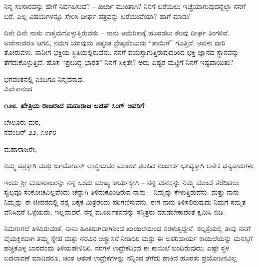 ನಿನ್ನ ಸಂಸಾರವನ್ನು ಹೇಗೆ ನಿರ್ವಹಿಸುವೆ? – ಖರ್ಚು ಮುಂತಾಗಿ? ನಿನಗೆ ಬರೆಯಲು ಇಚ್ಛೆಯಾಗುವುದನ್ನೆಲ್ಲಾ ನನಗೆ ಬರೆ. ಎಲ್ಲ ವಿಷಯಗಳನ್ನೂ ಸೇರಿಸಿ ದೀರ್ಘ ಪತ್ರವನ್ನು ಬರೆಯುವೆಯಾ? ಹಾಗೆ ಮಾಡು!

ದಿನೇ ದಿನೇ ನಾನು ಉತ್ತಮಗೊಳ್ಳುತ್ತಿರುವೆನು – ನಾನು ಅಮೆರಿಕಾಕ್ಕೆ ಹೊರಡಲು ಕೆಲವು ದೀರ್ಘ ತಿಂಗಳಿವೆ. ಅದೇನಾದರೂ ಆಗಲಿ, ನಮಗೆ ಯಾವುದು ಅತ್ಯಂತ ಶ್ರೇಷ್ಠವೆಂಬುದು “ತಾಯಿಗೆ” ಗೊತ್ತಿದೆ. ಅವಳು ದಾರಿ ತೋರುವಳು. ನಾನೀಗ ಭಕ್ತಿಯ ಸ್ಥಿತಿಯಲ್ಲಿರುವೆನು. ನನಗೆ ವಯಸ್ಸಾಗುತ್ತಿರುವುದರಿಂದ ಭಕ್ತಿ ಜ್ಞಾನದ ಸ್ಥಾನವನ್ನು ತೆಗೆದುಕೊಳ್ಳುತ್ತಿದೆ. ಹೊಸ “ಪ್ರಬುದ್ಧ ಭಾರತ” ನಿನಗೆ ಸಿಕ್ಕಿತೇ? ಅದು ಎಷ್ಟರ ಮಟ್ಟಿಗೆ ನಿನಗೆ ಇಷ್ಟವಾಯಿತು?

\begin{flushright}
ಭಗವಂತನಲ್ಲಿ ಎಂದಿಗೂ ನಿನ್ನವನಾದ,\\ವಿವೇಕಾನಂದ
\end{flushright}

\begin{center}
\textbf{೧೨೮. ಖೇತ್ರಿಯ ರಾಜರಾದ ಮಹಾರಾಜ ಅಜಿತ್ ಸಿಂಗ್ ಅವರಿಗೆ}
\end{center}

\begin{flushright}
ಬೇಲೂರು ಮಠ,\\ನವಂಬರ್ ೨೨, ೧೮೯೮
\end{flushright}

ಮಹಾರಾಜರೇ,

ನಿಮ್ಮ ಪತ್ರಕ್ಕಾಗಿ ಮತ್ತು ಜಗಮೋಹನ್ ಲಾಲ್ಜಿಯವರ ಮೂಲಕ ತಲಪಿದ ನಿಂಬಾರ್ಕ ಭಾಷ್ಯಕ್ಕಾಗಿ ಅನೇಕ ಧನ್ಯವಾದಗಳು.

ಇಂದು ಶ‍್ರೀ ಮಹಾರಾಜರನ್ನು ನನ್ನ ಒಂದು ಮುಖ್ಯ ಕಾರ್ಯಕ್ಕಾಗಿ – ನನ್ನ ಮನಸ್ಸನ್ನು ನಿಮ್ಮ ಮುಂದೆ ತೆರೆದಿಡಲು ಸ್ವಲ್ಪವೂ ಸಂಕೋಚವಿಲ್ಲವೆಂದು ಚೆನ್ನಾಗಿ ತಿಳಿದುಕೊಂಡಿರುವ ನಾನು – ನಿಮ್ಮನ್ನು ಕೇಳುತ್ತಿರುವೆನು. ಮತ್ತು ನಾನು ನಿಮ್ಮನ್ನು ಈ ಜೀವನದಲ್ಲಿ ನನ್ನ ಏಕೈಕ ಮಿತ್ರರೆಂದು ಪರಿಗಣಿಸುವೆನು. ಈಗ ನಾನು ತಿಳಿಸಲಿರುವುದು ನಿಮಗೆ ಸಮ್ಮತ ವೆನಿಸಿದರೆ ಒಳ್ಳೆಯದು; ಇಲ್ಲವಾದರೆ, ನನ್ನ ಮೂರ್ಖತನವನ್ನು ಸನ್ಮಿತ್ರರು ಮಾಡಬೇಕಾದಂತೆ ಕ್ಷಮಿಸಿ ಬಿಡಿ.

ನಿಮಗಾಗಲೆ ತಿಳಿದಿರುವಂತೆ, ನಾನು ಹಿಂತಿರುಗಿದಾಗಿನಿಂದ ಖಾಯಿಲೆಯಿಂದ ನರಳುತ್ತಿದ್ದೇನೆ. ಕಲ್ಕತ್ತೆಯಲ್ಲಿ ತಾವು ನನಗೆ ವೈಯಕ್ತಿಕವಾಗಿ ತಮ್ಮ ಸ್ನೇಹ ಮತ್ತು ನೆರವಿನ ಆಶ್ವಾಸನೆ ನೀಡಿದಿರಿ ಮತ್ತು ಈ ಅಪರಿಹಾರ್ಯ ಕಾಯಿಲೆಯನ್ನು ಮನಸ್ಸಿಗೆ ಹಚ್ಚಿಕೊಳ್ಳ ಬಾರದೆಂದು ತಿಳಿಯಹೇಳಿದಿರಿ. ನರಗಳ ಉದ್ರೇಕದಿಂದ ಈ ಕಾಯಿಲೆ ಬಂದಿರುವುದು; ಎಷ್ಟೇ ಸ್ಥಳ ಬದಲಾವಣೆ ಮಾಡಿದರೂ, ಚಿಂತೆ ಆತಂಕ ಉದ್ರೇಕಗಳನ್ನು ನನ್ನಿಂದ ತೆಗೆದು ಹಾಕಿದ ಹೊರತು ಪ್ರಯೋಜನವಿಲ್ಲ.

